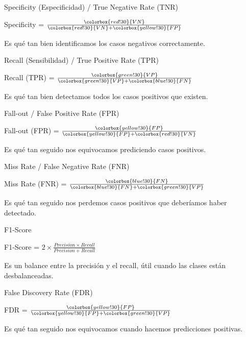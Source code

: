 \documentclass{beamer}
\begin{document}
\begin{frame}{Specificity (Especificidad) / True Negative Rate (TNR)}
    \begin{center}
    \Large Specificity = $\frac{\colorbox{red!30}{VN}}{\colorbox{red!30}{VN} + \colorbox{yellow!30}{FP}}$
    \end{center}
    Es qué tan bien identificamos los casos negativos correctamente.
\end{frame}

\begin{frame}{Recall (Sensibilidad) / True Positive Rate (TPR)}
    \begin{center}
    \Large Recall (TPR) = $\frac{\colorbox{green!30}{VP}}{\colorbox{green!30}{VP} + \colorbox{blue!30}{FN}}$
    \end{center}
    Es qué tan bien detectamos todos los casos positivos que existen.
\end{frame}

\begin{frame}{Fall-out / False Positive Rate (FPR)}
    \begin{center}
    \Large Fall-out (FPR) = $\frac{\colorbox{yellow!30}{FP}}{\colorbox{yellow!30}{FP} + \colorbox{red!30}{VN}}$
    \end{center}
    Es qué tan seguido nos equivocamos prediciendo casos positivos.
\end{frame}

\begin{frame}{Miss Rate / False Negative Rate (FNR)}
    \begin{center}
    \Large Miss Rate (FNR) = $\frac{\colorbox{blue!30}{FN}}{\colorbox{blue!30}{FN} + \colorbox{green!30}{VP}}$
    \end{center}
    Es qué tan seguido nos perdemos casos positivos que deberíamos haber detectado.
\end{frame}

\begin{frame}{F1-Score}
    \begin{center}
    \Large F1-Score = $2 \times \frac{Precision \times Recall}{Precision + Recall}$
    \end{center}
    Es un balance entre la precisión y el recall, útil cuando las clases están desbalanceadas.
\end{frame}

\begin{frame}{False Discovery Rate (FDR)}
    \begin{center}
    \Large FDR = $\frac{\colorbox{yellow!30}{FP}}{\colorbox{yellow!30}{FP} + \colorbox{green!30}{VP}}$
    \end{center}
    Es qué tan seguido nos equivocamos cuando hacemos predicciones positivas.
\end{frame}
\end{document}
